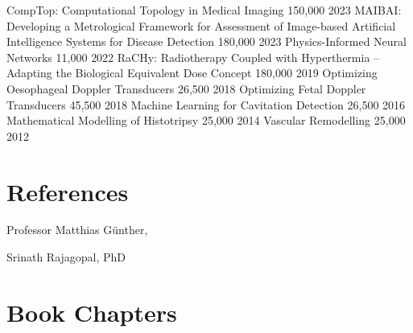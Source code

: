 \documentclass[11pt, a4paper]{awesome-cv}
\begin{document}
\begin{cvhonorsStretch}
%
{}%
{CompTop: Computational Topology in Medical Imaging}%
{\texteuro{}150,000}%
{2023}
%
%
{}%
{MAIBAI: Developing a Metrological Framework for Assessment of Image-based Artificial Intelligence Systems for Disease Detection}%
{\texteuro{}180,000}%
{2023}
%
%
{Physics-Informed Neural Networks }%
{\texteuro{}11,000}%
{2022}
%
%
{RaCHy: Radiotherapy Coupled with Hyperthermia -- Adapting the Biological Equivalent Dose Concept}%
{\textsterling{}180,000}%
{2019}
%
%
{Optimizing Oesophageal Doppler Transducers}%
{\textsterling{}26,500}%
{2018}
%
%
{Optimizing Fetal Doppler Transducers}%
{\textsterling{}45,500}%
{2018}
%
%
{Machine Learning for Cavitation Detection}%
{\textsterling{}26,500}%
{2016}
%
%
{Mathematical Modelling of Histotripsy}%
{\textsterling{}25,000}%
{2014}
%
%
{Vascular Remodelling}%
{\textsterling{}25,000}%
{2012}
%
\end{cvhonorsStretch}

\hypertarget{References}{\section{References}\label{refs}}

Professor Matthias G\"{u}nther,

Srinath Rajagopal, PhD

\newpage
\hypertarget{Book Chapters}{\section{Book Chapters}\label{chapters}}
\end{document}
